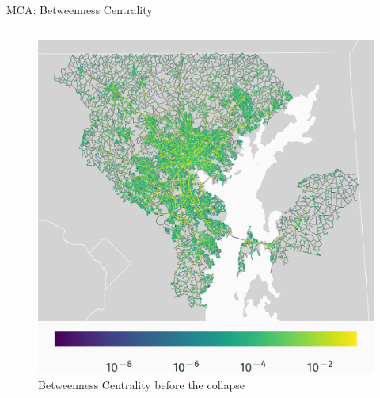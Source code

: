 \documentclass{beamer}
\numberwithin{figure}{section} %
\numberwithin{table}{section} %
\begin{document}
\begin{frame}{MCA: Betweenness Centrality}
    \begin{columns}
        \begin{column}{0.33\textwidth}
            \begin{figure}
                \centering
                \includegraphics[width=\textwidth]{maps/betweenness_w_bridge.png}
                {\scriptsize Betweenness Centrality before the collapse}
            \end{figure}
        \end{column}


\end{columns}
\end{frame}
\end{document}
